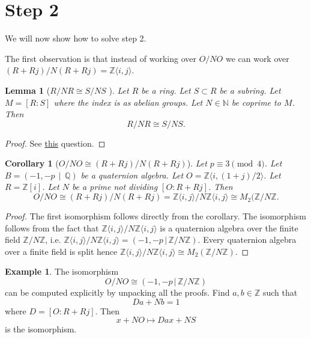 \documentclass[10pt]{article}
\theoremstyle{plain}
\newtheorem{lemma}[theorem]{Lemma}
\newtheorem{corollary}[theorem]{Corollary}
\theoremstyle{definition}
\newtheorem{example}[theorem]{Example}
\newcommand{\iso}{\cong}
\newcommand{\N}{\mathbb{N}}
\newcommand{\Z}{\mathbb{Z}}
\newcommand{\Q}{\mathbb{Q}}
\begin{document}
\section{Step 2}

We will now show how to solve step 2.

The first observation is that instead of working over \( O / NO \) we can work over \( (R+Rj) / N(R+Rj) = \Z \langle i, j \rangle \).

\begin{lemma}[\( R/ NR \iso S / NS \) ]
    Let \( R \) be a ring.
    Let \( S \subset R \) be a subring.
    Let \( M = [R : S] \) where the index is as abelian groups.
    Let \( N \in \N \) be coprime to \( M \).
    Then
    \[
        R / NR \iso S / NS.
    \]
\end{lemma}
\begin{proof}
    See \href{https://math.stackexchange.com/questions/387931/fracsms-is-isomorphic-to-fracrmr-where-m-is-coprime-to-n}{this} question.
\end{proof}

\begin{corollary}[\( O / NO \iso (R + Rj) / N(R + Rj)\)]
    Let \( p \equiv 3 \pmod{4} \).
    Let \( B =  (-1, -p \, \mid \, \Q) \) be a quaternion algebra.
    Let \( O = \Z \langle i, (1+j) / 2 \rangle \).
    Let \( R = \Z[i] \).
    Let \( N \) be a prime not dividing \( [O : R + Rj] \).
    Then
    \[
        O / NO \iso (R + Rj) / N(R + Rj) = \Z \langle i, j \rangle / N \Z \langle i, j \rangle \iso M_2(\Z / N\Z.
    \]
\end{corollary}
\begin{proof}
    The first isomorphism follows directly from the corollary.
    The isomorphism follows from the fact that \( \Z \langle i, j \rangle / N \Z \langle i, j \rangle \) is a quaternion algebra over the finite field \( \Z / N \Z \), i.e. \( \Z \langle i, j \rangle / N \Z \langle i, j \rangle = (-1, -p \, | \, \Z / N \Z ) \).
    Every quaternion algebra over a finite field is split hence \( \Z \langle i, j \rangle / N \Z \langle i, j \rangle \iso M_2(\Z / N \Z) \).
\end{proof}

\begin{example}
    The isomorphism
    \[
        O / NO \iso (-1, -p \, | \, \Z / N\Z)
    \]
    can be computed explicitly by unpacking all the proofs.
    Find \( a, b \in \Z \) such that
    \[
        Da + Nb = 1
    \]
    where \( D = [O : R + Rj] \).
    Then
    \[
        x + NO \mapsto Dax + NS
    \]
    is the isomorphism.
\end{example}
\end{document}
